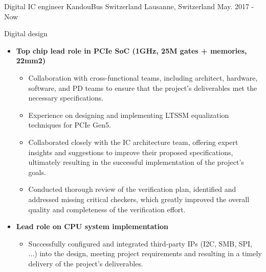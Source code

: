 

\begin{cventries}

  \cventry
    {Digital IC engineer} %
    {KandouBus Switzerland} %
    {Lausanne, Switzerland} %
    {May. 2017 - Now} %
    {
      \begin{cvitems} %
        \item {Digital design}
        \begin{itemize}
          \item {\textbf{Top chip lead role in PCIe SoC (1GHz, 25M gates + memories, 22mm2)}}
          \begin{itemize}
            \item {Collaboration with cross-functional teams, including architect, hardware, software, and PD teams to ensure that the project's deliverables met the necessary specifications.}
            \item {Experience on designing and implementing LTSSM equalization techniques for PCIe Gen5.}
            \item {Collaborated closely with the IC architecture team, offering expert insights and suggestions to improve their proposed specifications, ultimately resulting in the successful implementation of the project's goals.}
            \item {Conducted thorough review of the verification plan, identified and addressed missing critical checkers, which greatly improved the overall quality and completeness of the verification effort.}
          \end{itemize}
          \item {\textbf{Lead role on CPU system implementation}}
          \begin{itemize}
            \item {Successfully configured and integrated third-party IPs (I2C, SMB, SPI, ...) into the design, meeting project requirements and resulting in a timely delivery of the project's deliverables.}

\end{itemize}
\end{itemize}
\end{cvitems}}
\end{cventries}
